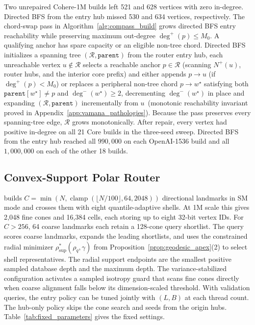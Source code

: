 Two unrepaired {Cohere-1M} builds left 521 and 628 vertices with zero in-degree. Directed {BFS} from the entry hub missed 530 and 634 vertices, respectively.
The chord-swap pass in Algorithm~\ref{alg:compass_build} grows directed {BFS} entry reachability while preserving maximum out-degree $\deg^+(p)\le M_0$. A qualifying anchor has spare capacity or an eligible non-tree chord.
Directed {BFS} initializes a spanning tree $(\mathcal{R},\texttt{parent})$ from the router entry hub, each unreachable vertex $u \notin \mathcal{R}$ selects a reachable anchor $p \in \mathcal{R}$ (scanning $N^+(u)$, router hubs, and the interior core prefix) and either appends $p \to u$ (if $\deg^+(p) < M_0$) or replaces a peripheral non-tree chord $p \to w^\star$ satisfying both $\texttt{parent}[w^\star] \ne p$ and $\deg^-(w^\star) \ge 2$, decrementing $\deg^-(w^\star)$ in place and expanding $(\mathcal{R}, \texttt{parent})$ incrementally from $u$\ifpreprint\ (monotonic reachability invariant proved in Appendix~\ref{app:vamana_pathologies})\fi.
Because the pass preserves every spanning-tree edge, $\mathcal{R}$ grows monotonically. After repair, every vertex had positive in-degree on all 21 Core builds in the three-seed sweep. Directed {BFS} from the entry hub reached all $990{,}000$ on each {OpenAI-1536} build and all $1{,}000{,}000$ on each of the other 18 builds.

\subsection{Convex-Support Polar Router}
\label{subsec:router}

\rquiver{} builds $C=\min(N,\operatorname{clamp}(\lfloor N/100\rfloor,64,2048))$ directional landmarks in SM mode and crosses them with eight quantile-adaptive shells. At 1M scale this gives 2,048 fine cones and 16,384 cells, each storing up to eight 32-bit vertex IDs. For $C>256$, 64 coarse landmarks each retain a 128-cone query shortlist.
The query scores coarse landmarks, expands the leading shortlists, and uses the constrained radial minimizer $\rho_{\mathrm{sup}}^*(\rho_q,\gamma)$ from Proposition~\ref{prop:geodesic_apex}(2) to select shell representatives. The radial support endpoints are the smallest positive sampled database depth and the maximum depth. The variance-stabilized configuration activates a sampled isotropy guard that scans fine cones directly when coarse alignment falls below its dimension-scaled threshold. With validation queries, the entry policy can be tuned jointly with $(L,B)$ at each thread count. The hub-only policy skips the cone search and seeds from the origin hubs. Table~\ref{tab:fixed_parameters} gives the fixed settings.

